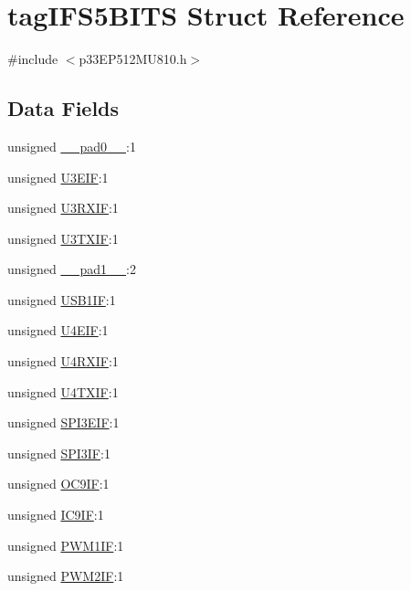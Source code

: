 \hypertarget{structtag_i_f_s5_b_i_t_s}{}\section{tag\+I\+F\+S5\+B\+I\+TS Struct Reference}
\label{structtag_i_f_s5_b_i_t_s}


{\ttfamily \#include $<$p33\+E\+P512\+M\+U810.\+h$>$}

\subsection*{Data Fields}
\begin{DoxyCompactItemize}
\item 
unsigned \hyperlink{structtag_i_f_s5_b_i_t_s_adf71f3d8410c1f1dbbc96680a92c49af}{\+\_\+\+\_\+pad0\+\_\+\+\_\+}\+:1
\item 
unsigned \hyperlink{structtag_i_f_s5_b_i_t_s_ade18eca492c8203f1661b62b3066ac36}{U3\+E\+IF}\+:1
\item 
unsigned \hyperlink{structtag_i_f_s5_b_i_t_s_a48aae3eb5dbc8df515f511eb70855c6e}{U3\+R\+X\+IF}\+:1
\item 
unsigned \hyperlink{structtag_i_f_s5_b_i_t_s_adce862b83f0b0d758688c1c82d7c9992}{U3\+T\+X\+IF}\+:1
\item 
unsigned \hyperlink{structtag_i_f_s5_b_i_t_s_acaf2d0924a107ec6e8d2e31febaf66f9}{\+\_\+\+\_\+pad1\+\_\+\+\_\+}\+:2
\item 
unsigned \hyperlink{structtag_i_f_s5_b_i_t_s_ac6482e8da3582b172281d4ee8d4967b1}{U\+S\+B1\+IF}\+:1
\item 
unsigned \hyperlink{structtag_i_f_s5_b_i_t_s_a8a81acc9b7e39071dc714e0c4d99153a}{U4\+E\+IF}\+:1
\item 
unsigned \hyperlink{structtag_i_f_s5_b_i_t_s_a217d9e2e7b18964140fe0fed8b8d210c}{U4\+R\+X\+IF}\+:1
\item 
unsigned \hyperlink{structtag_i_f_s5_b_i_t_s_a724b8a99ab4a10d3304131ddad3d38ff}{U4\+T\+X\+IF}\+:1
\item 
unsigned \hyperlink{structtag_i_f_s5_b_i_t_s_a8d6d19dbb72cf016948dfad482a09e09}{S\+P\+I3\+E\+IF}\+:1
\item 
unsigned \hyperlink{structtag_i_f_s5_b_i_t_s_ab5204bad98a45c14b96beac101c25ded}{S\+P\+I3\+IF}\+:1
\item 
unsigned \hyperlink{structtag_i_f_s5_b_i_t_s_a37773c0e829bcf7471906a4d15f8581b}{O\+C9\+IF}\+:1
\item 
unsigned \hyperlink{structtag_i_f_s5_b_i_t_s_a1e44b339bff86c8ddaa29e38f06263cc}{I\+C9\+IF}\+:1
\item 
unsigned \hyperlink{structtag_i_f_s5_b_i_t_s_ade7baa0224267d4178dae71af679e7e2}{P\+W\+M1\+IF}\+:1
\item 
unsigned \hyperlink{structtag_i_f_s5_b_i_t_s_a17be2de09d33c0a02318373585c7eff7}{P\+W\+M2\+IF}\+:1
\end{DoxyCompactItemize}


